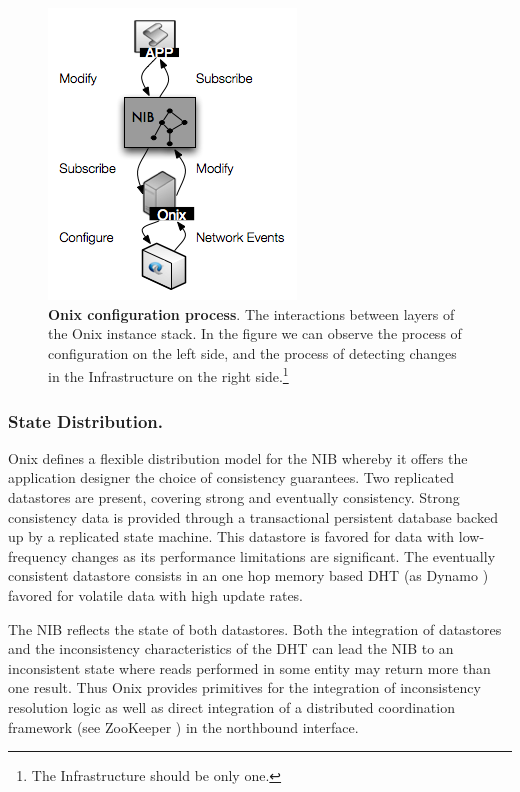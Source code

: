 \begin{itemize}
\begin{figure}
  \centering 
  \includegraphics[scale=0.5]{pic/onix-process.png}
  \caption[Onix configuration process]{\textbf{Onix configuration
      process}. The interactions between layers of the Onix
    instance stack. In the figure we can observe the process of
    configuration on the left side, and the process of detecting
    changes in the Infrastructure on the right side.\footnote{The Infrastructure should be only one.}} 
  \label{fig:onix-process}
\end{figure}

\subsubsection{State Distribution.} Onix defines a flexible distribution model for the NIB 
whereby  it offers the application
designer the choice of consistency guarantees. Two
replicated datastores are present, covering  strong 
and  eventually consistency. Strong consistency data is
provided through a transactional persistent database backed up by a replicated
state machine. This datastore is
favored for data with low-frequency changes  as its performance limitations are
significant. The eventually consistent datastore consists in 
an one hop memory based DHT  (as Dynamo 
\cite{DeCandia:2007cn}) favored for  volatile data with high update
rates. 

The NIB reflects the state of both datastores. Both the integration of
datastores and the inconsistency  characteristics of the DHT can lead the
NIB to an inconsistent state where reads performed in some entity may
return more than one result. Thus Onix provides primitives
for the integration of inconsistency resolution logic as well as 
direct integration of a distributed
coordination framework (see  ZooKeeper \cite{Hunt:2010ux}) in the
northbound interface. 


\end{itemize}
